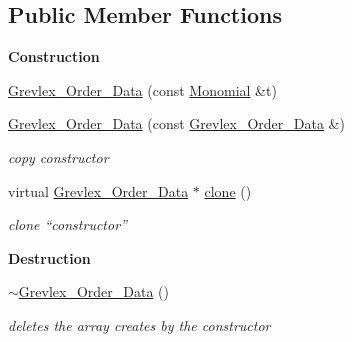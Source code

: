 \subsection*{Public Member Functions}
\begin{Indent}\textbf{ Construction}\par
\begin{DoxyCompactItemize}
\item 
\hyperlink{class_grevlex___order___data_a61000659db1597c1fb7f149deb0d952c}{Grevlex\+\_\+\+Order\+\_\+\+Data} (const \hyperlink{class_monomial}{Monomial} \&t)
\item 
\mbox{\label{class_grevlex___order___data_a53b3cafb2c36cea8c58aba05eeb422ea}} 
\hyperlink{class_grevlex___order___data_a53b3cafb2c36cea8c58aba05eeb422ea}{Grevlex\+\_\+\+Order\+\_\+\+Data} (const \hyperlink{class_grevlex___order___data}{Grevlex\+\_\+\+Order\+\_\+\+Data} \&)
\begin{DoxyCompactList}\small\item\em copy constructor \end{DoxyCompactList}\item 
\mbox{\label{class_grevlex___order___data_a60129a9652bd0733ec61db63f8a878b5}} 
virtual \hyperlink{class_grevlex___order___data}{Grevlex\+\_\+\+Order\+\_\+\+Data} $\ast$ \hyperlink{class_grevlex___order___data_a60129a9652bd0733ec61db63f8a878b5}{clone} ()
\begin{DoxyCompactList}\small\item\em clone ``constructor'' \end{DoxyCompactList}\end{DoxyCompactItemize}
\end{Indent}
\begin{Indent}\textbf{ Destruction}\par
\begin{DoxyCompactItemize}
\item 
\mbox{\label{class_grevlex___order___data_a275afe22c3514d5602eda962402821c3}} 
\hyperlink{class_grevlex___order___data_a275afe22c3514d5602eda962402821c3}{$\sim$\+Grevlex\+\_\+\+Order\+\_\+\+Data} ()
\begin{DoxyCompactList}\small\item\em deletes the array creates by the constructor \end{DoxyCompactList}\end{DoxyCompactItemize}
\end{Indent}
